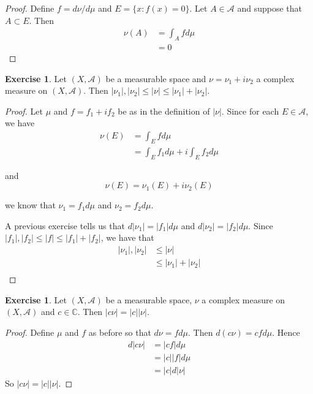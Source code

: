 \documentclass[12pt]{amsart}
\theoremstyle{definition}
\newtheorem{ex}[definition]{Exercise}
\newcommand{\C}{\mathbb{C}}
\newcommand{\MA}{\mathcal{A}}
\begin{document}
	\begin{proof}
		Define $f = d\nu / d \mu$ and $E = \{x: f(x) = 0\}$. Let $A \in \MA$ and suppose that $A \subset E$. Then 
		\begin{align*}
			\nu(A) 
			&= \int_A f d\mu\\
			&= 0
		\end{align*} 
	\end{proof}
	
	\begin{ex}
		Let $(X, \MA)$ be a measurable space and $\nu = \nu_1 + i\nu_2$ a complex measure on $(X, \MA)$. Then $|\nu_1|, |\nu_2| \leq |\nu| \leq |\nu_1| + |\nu_2|$.
		
	\end{ex}
	
	\begin{proof}
		Let $\mu$ and $f = f_1 + i f_2$ be as in the definition of $|\nu|$. Since for each $E \in \MA$, we have 
		\begin{align*}
			\nu(E) 
			&= \int_E f d\mu\\
			&= \int_E f_1 d \mu + i \int_E f_2 d\mu
		\end{align*}
		
		and $$\nu(E) = \nu_1(E) + i\nu_2(E)$$
		
		we know that $\nu_1 = f_1 d\mu$ and $\nu_2 = f_2 d \mu$. 
		
		A previous exercise tells us that $d|\nu_1| = |f_1|d\mu$ and $d |\nu_2| = |f_2|d \mu$. Since $|f_1|, |f_2| \leq |f| \leq |f_1|+|f_2|$, we have that 
		\begin{align*}
			|\nu_1|, |\nu_2| 
			&\leq |\nu| \\
			&\leq |\nu_1| + |\nu_2|\\
		\end{align*}
	\end{proof}
	
	\begin{ex}
		Let  $(X, \MA)$ be a measurable space, $\nu$ a complex measure on $(X, \MA)$ and $c \in \C$. Then $\vert c \nu \vert = \vert c \vert \vert \nu \vert$.
	\end{ex}
	
	\begin{proof}
		Define $\mu$ and $f$ as before so that $d \nu = f d \mu$. Then $d (c \nu) = c f d \mu$. Hence 
		\begin{align*}
			d \vert c \nu \vert 
			&= \vert cf \vert d \mu \\
			&= \vert c \vert \vert f \vert d \mu\\
			&= \vert c \vert d\vert \nu \vert
		\end{align*}
		So $\vert c \nu \vert = \vert c \vert \vert  \nu \vert$.
	\end{proof}
\end{document}
